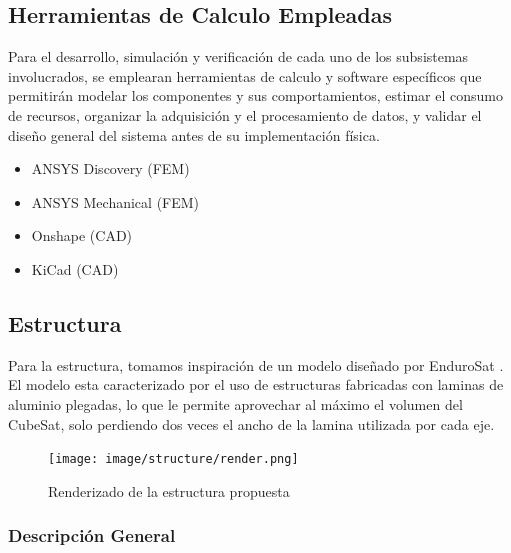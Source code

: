   \subsection{Herramientas de Calculo Empleadas}
    Para el desarrollo, simulación y verificación de cada uno de los subsistemas involucrados,
    se emplearan herramientas de calculo y software específicos que permitirán modelar los componentes
    y sus comportamientos, estimar el consumo de recursos, organizar la adquisición y
    el procesamiento de datos, y validar el diseño general del sistema antes de su implementación
    física.

    \begin{itemize}
      \item ANSYS Discovery (FEM)
      \item ANSYS Mechanical (FEM)
      \item Onshape (CAD)
      \item KiCad (CAD)
    \end{itemize}

  \subsection{Estructura}
    Para la estructura, tomamos inspiración de un modelo diseñado por EnduroSat \cite{endurosat}. El
    modelo esta caracterizado por el uso de estructuras fabricadas con laminas de aluminio
    plegadas, lo que le permite aprovechar al máximo el volumen del CubeSat, solo perdiendo
    dos veces el ancho de la lamina utilizada por cada eje.

    \begin{figure}[H]
      \centering
      \texttt{[image: image/structure/render.png]}
      \caption{Renderizado de la estructura propuesta}
      \label{fig:render}
    \end{figure}

    \subsubsection{Descripción General}

